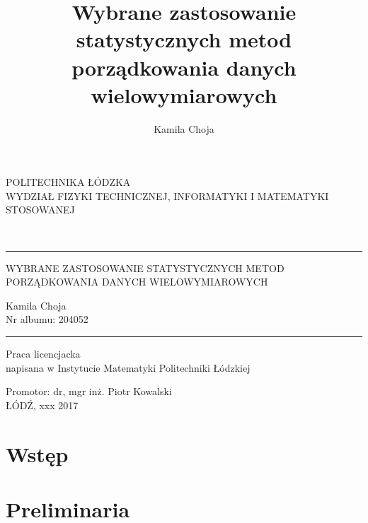 \documentclass[12pt,a4paper]{report}
\author{Kamila Choja}
\title{Wybrane zastosowanie statystycznych metod porządkowania danych wielowymiarowych}
\begin{document}
\begin{titlepage}
\begin{center}
        \vspace*{1cm}
        {\large POLITECHNIKA ŁÓDZKA}\\
       \vspace*{1cm}
        {\large WYDZIAŁ FIZYKI TECHNICZNEJ, INFORMATYKI I MATEMATYKI STOSOWANEJ}\\
        \vspace*{2cm}
    \end{center}        
        
\\
\vspace*{0.3cm}
\hspace*{0.3cm}
  
\begin{center}
\rule{\textwidth}{0.5pt}

\vspace*{0.5cm}
   
{\large WYBRANE ZASTOSOWANIE STATYSTYCZNYCH METOD\\ }
{\large PORZĄDKOWANIA DANYCH WIELOWYMIAROWYCH\\}
\vspace*{1cm}


\begin{flushright}
Kamila Choja\\
Nr albumu: 204052 
 \end{flushright}
\rule{\textwidth}{0.5pt}

Praca licencjacka\\
napisana w Instytucie Matematyki Politechniki Łódzkiej\\

\vspace*{2cm}

Promotor: dr, mgr inż. Piotr Kowalski\\
\vfill
ŁÓDŹ, xxx 2017


     \end{center}   
\end{titlepage}

\tableofcontents

\chapter{Wstęp}


\chapter{Preliminaria}  
\end{document}
